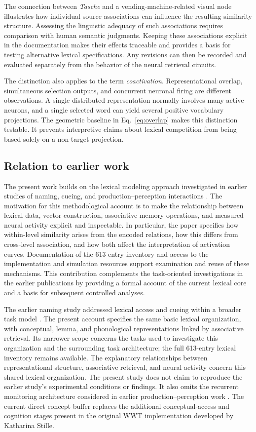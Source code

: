 The connection between \emph{Tasche} and a vending-machine-related visual node illustrates how individual source associations can influence the resulting similarity structure. Assessing the linguistic adequacy of such associations requires comparison with human semantic judgments. Keeping these associations explicit in the documentation makes their effects traceable and provides a basis for testing alternative lexical specifications. Any revisions can then be recorded and evaluated separately from the behavior of the neural retrieval circuits.

The distinction also applies to the term \emph{coactivation}. Representational overlap, simultaneous selection outputs, and concurrent neuronal firing are different observations. A single distributed representation normally involves many active neurons, and a single selected word can yield several positive vocabulary projections. The geometric baseline in Eq.~\eqref{eq:overlap} makes this distinction testable. It prevents interpretive claims about lexical competition from being based solely on a non-target projection.

\subsection{Relation to earlier work}
The present work builds on the lexical modeling approach investigated in earlier studies of naming, cueing, and production--perception interactions \citep{stille2020,kroeger2016}. The motivation for this methodological account is to make the relationship between lexical data, vector construction, associative-memory operations, and measured neural activity explicit and inspectable. In particular, the paper specifies how within-level similarity arises from the encoded relations, how this differs from cross-level association, and how both affect the interpretation of activation curves. Documentation of the 613-entry inventory and access to the implementation and simulation resources support examination and reuse of these mechanisms. This contribution complements the task-oriented investigations in the earlier publications by providing a formal account of the current lexical core and a basis for subsequent controlled analyses.

The earlier naming study addressed lexical access and cueing within a broader task model \citep{stille2020}. The present account specifies the same basic lexical organization, with conceptual, lemma, and phonological representations linked by associative retrieval. Its narrower scope concerns the tasks used to investigate this organization and the surrounding task architecture; the full 613-entry lexical inventory remains available. The explanatory relationships between representational structure, associative retrieval, and neural activity concern this shared lexical organization. The present study does not claim to reproduce the earlier study's experimental conditions or findings. It also omits the recurrent monitoring architecture considered in earlier production--perception work \citep{kroeger2016}. The current direct concept buffer replaces the additional conceptual-access and cognition stages present in the original WWT implementation developed by Katharina Stille.

